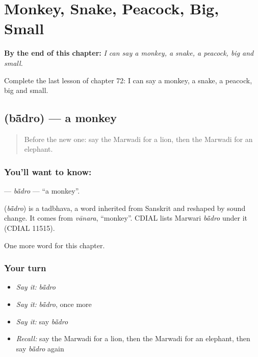
\chapter{Monkey, Snake, Peacock, Big, Small}
\label{ch:mw-monkey-snake-peacock-big-small}

\begin{chapteropening}
\textbf{By the end of this chapter:} \emph{I can say a monkey, a snake, a peacock, big and small.}

Complete the last lesson of chapter 72: I can say a monkey, a snake, a peacock, big and small.
\end{chapteropening}

\section[\texorpdfstring{\mw{बांदरो} (bā̃dro)}{बांदरो (bā̃dro)}]{ (bā̃dro) — a monkey}

\label{lesson:MW-C72-badro}



\begin{quote}
Before the new one: say the Marwadi for a lion, then the Marwadi for an elephant.
\end{quote}

\subsection*{You'll want to know: }
\textbf{} — \emph{bā̃dro} — \textquotedblleft{}a monkey\textquotedblright{}.

\begin{cousinweb}
\textbf{} (\emph{bā̃dro}) is a tadbhava, a word inherited from Sanskrit and reshaped by sound change. It comes from \emph{vānara}, \textquotedblleft{}monkey\textquotedblright{}. CDIAL lists Marwari \emph{bā̃dro} under it (CDIAL 11515).
\end{cousinweb}

\begin{grammarlens}[title={What you've built}]
One more word for this chapter.
\end{grammarlens}

\subsection*{Your turn}
\begin{itemize}
\raggedright
  \item \emph{Say it:} \emph{bā̃dro}
  \item \emph{Say it:} \emph{bā̃dro}, once more
  \item \emph{Say it:} say \emph{bā̃dro}
  \item \emph{Recall:} say the Marwadi for a lion, then the Marwadi for an elephant, then say \emph{bā̃dro} again
\end{itemize}

